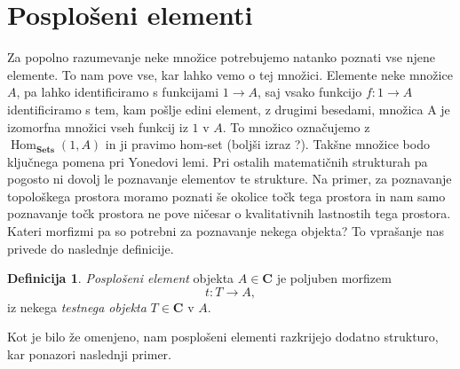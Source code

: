 \documentclass[12pt,a4paper]{book}
\theoremstyle{definition}
\newtheorem{definicija}{Definicija}[chapter]
\theoremstyle{plain}
\theoremstyle{definition}
\theoremstyle{remark}
\newcommand{\cat}[1]{\textbf{#1}}
\DeclareMathOperator{\Hom}{Hom}
\begin{document}
\section{Posplošeni elementi}
Za popolno razumevanje neke množice potrebujemo natanko poznati vse njene elemente. To nam pove vse, kar lahko vemo o tej množici. Elemente neke množice $A$, pa lahko identificiramo s funkcijami $1 \to A$, saj vsako funkcijo $f : 1 \to A$ identificiramo s tem, kam pošlje edini element, z drugimi besedami, množica A je izomorfna množici vseh funkcij iz $1$ v $A$. To množico označujemo z $\Hom_{\cat{Sets}} (1,A)$ in ji pravimo hom-set (boljši izraz ?). Takšne množice bodo ključnega pomena pri Yonedovi lemi.
Pri ostalih matematičnih strukturah pa pogosto ni dovolj le poznavanje elementov te strukture. Na primer, za poznavanje topološkega prostora moramo poznati še okolice točk tega prostora in nam samo poznavanje točk prostora ne pove ničesar o kvalitativnih lastnostih tega prostora. Kateri morfizmi pa so potrebni za poznavanje nekega objekta? To vprašanje nas privede do naslednje definicije.

\begin{definicija}
\emph{Posplošeni element} objekta $A \in \cat{C}$ je poljuben morfizem 
$$t : T \to A,$$
iz nekega \emph{testnega objekta} $T \in \cat{C}$ v $A$.
\end{definicija}
Kot je bilo že omenjeno, nam posplošeni elementi razkrijejo dodatno strukturo, kar ponazori naslednji primer.
\end{document}

